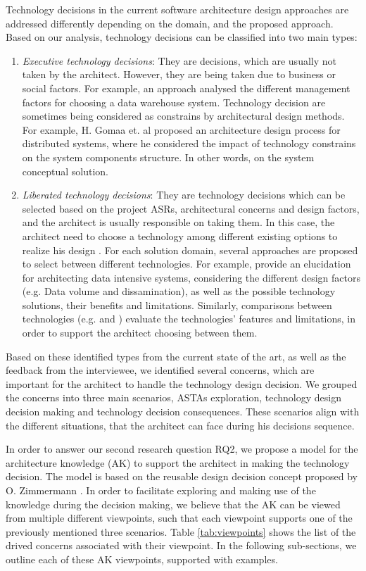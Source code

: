 \documentclass[conference]{IEEEtran}
\begin{document}
Technology decisions in the current software architecture design approaches are
addressed differently depending on the domain, and the proposed approach. Based
on our analysis, technology decisions can be classified into two main types:
\begin{enumerate}
\item \textit{Executive technology decisions}: They are decisions, which are
usually not taken by the architect. However, they are being taken due to business or
social factors. For example, an approach \cite{Ariyachandra2010200} analysed the
different management factors for choosing a data warehouse system. Technology
decision are sometimes being considered as constrains by architectural
design methods. For example, H. Gomaa et. al \cite{Gomaa1996} proposed an
architecture design process for distributed systems, where he considered the impact of technology constrains
on the system components structure. In other words, on the system conceptual solution.
\item \textit{Liberated technology decisions}: They are technology decisions
which can be selected based on the project ASRs, architectural concerns and
design factors, and the architect is usually responsible on taking them. In this
case, the architect need to choose a technology among different existing options
to realize his design \cite{BassBook2012}. For each solution domain, several
approaches are proposed to select between different technologies. For example,
\cite{BigDataMedvidovic} provide an elucidation for architecting data intensive
systems, considering the different design factors (e.g. Data volume and
dissamination), as well as the possible technology solutions, their benefits and
limitations. Similarly, comparisons between technologies (e.g.
\cite{ZimmermanWebServiceRest} and \cite{ZdunMiddelwareEv}) evaluate the
technologies' features and limitations, in order to support the architect
choosing between them.
\end{enumerate}

Based on these identified types from the current state of the art, as well as
the feedback from the interviewee, we identified several concerns, which are
important for the architect to handle the technology design decision. We grouped
the concerns into three main scenarios, ASTAs exploration, technology design
decision making and technology decision consequences. These scenarios align with
the different situations, that the architect can face during his decisions sequence.

In order to answer our second research question RQ2, we propose a model for the
architecture knowledge (AK) to support the architect in making the technology
decision. The model is based on the reusable design decision concept proposed by
O. Zimmermann \cite{Zimmermann2009}. In order to facilitate exploring and making
use of the knowledge during the decision making, we believe that the AK can be viewed from
multiple different viewpoints, such that each viewpoint supports one of the
previously mentioned three scenarios. Table \ref{tab:viewpoints} shows the list
of the drived concerns associated with their viewpoint. In the following
sub-sections, we outline each of these AK viewpoints, supported with examples.
\end{document}
